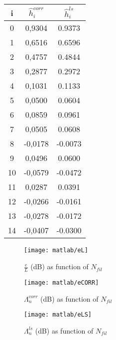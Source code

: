 \documentclass{article}
\renewcommand{\vec}[1]{\underline{#1}}
\begin{document}
\begin{table}
\centering
  	 												 
\begin{tabular}{|c|c|c|}
\hline
i & $ \hat{h}_i^{corr} $            & $\hat{h}_i^{ls} $          \\
\hline
0 &	0,9304	& 0.9373\\
\hline
1 &	0,6516	& 0.6596\\
\hline
2 &	0,4757	& 0.4844\\
\hline
3 &	0,2877	& 0.2972\\
\hline
4 &	0,1031	& 0.1133\\
\hline
5 &	0,0500	& 0.0604\\
\hline
6 &	0,0859	& 0.0961\\
\hline
7 &	0,0505	& 0.0608\\
\hline
8 &	-0,0178	& -0.0073\\
\hline
9 &	0,0496	& 0.0600\\
\hline
10 &	 -0,0579	& -0.0472\\
\hline
11 &	 0,0287	& 0.0391\\
\hline
12 &	 -0,0266 	& -0.0161\\
\hline
13 &	 -0,0278 	&-0.0172\\
\hline
14 &	 -0,0407 	& -0.0300\\
\hline
\end{tabular}
\end{table}
\begin{figure}[htbp]
  \centering
  \texttt{[image: matlab/eL]}
  \caption{$\frac{e}{L}$ (dB) as function of $N_{fil}$}
    \label{plot:eL}
\end{figure}

\begin{figure}[htbp]
  \centering
  \texttt{[image: matlab/eCORR]}
  \caption{$\Lambda_n^{corr}$ (dB) as function of $N_{fil}$}
    \label{plot:snrCORR}
\end{figure}
\begin{figure}[htbp]
  \centering
  \texttt{[image: matlab/eLS]}
  \caption{$\Lambda_n^{ls}$ (dB) as function of $N_{fil}$}
  
    \label{plot:snrLS}
\end{figure}
\end{document}
